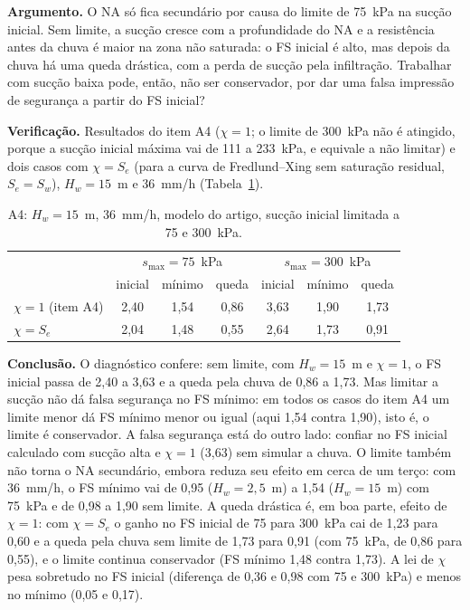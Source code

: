 \textbf{Argumento.} O NA s\'o fica secund\'ario por causa do limite de 75~kPa na suc\c{c}\~ao inicial. Sem limite, a
suc\c{c}\~ao cresce com a profundidade do NA e a resist\^encia antes da chuva \'e maior na zona n\~ao saturada: o FS
inicial \'e alto, mas depois da chuva h\'a uma queda dr\'astica, com a perda de suc\c{c}\~ao pela infiltra\c{c}\~ao.
Trabalhar com suc\c{c}\~ao baixa pode, ent\~ao, n\~ao ser conservador, por dar uma falsa impress\~ao de seguran\c{c}a a
partir do FS inicial?

\textbf{Verifica\c{c}\~ao.} Resultados do item A4 ($\chi=1$; o limite de 300~kPa n\~ao \'e atingido, porque a
suc\c{c}\~ao inicial m\'axima vai de 111 a 233~kPa, e equivale a n\~ao limitar) e dois casos com $\chi=S_e$ (para a
curva de Fredlund--Xing sem satura\c{c}\~ao residual, $S_e=S_w$), $H_w=15$~m e 36~mm/h (Tabela~\ref{tab:disc_A4}).

\begin{table}[h!]
\centering\small
\caption{A4: $H_w=15$~m, 36~mm/h, modelo do artigo, suc\c{c}\~ao inicial limitada a 75 e 300~kPa.}\label{tab:disc_A4}
\begin{tabular}{lcccccc}
\toprule
& \multicolumn{3}{c}{$s_{\max}=75$~kPa} & \multicolumn{3}{c}{$s_{\max}=300$~kPa}\\
& inicial & m\'inimo & queda & inicial & m\'inimo & queda\\
\midrule
$\chi=1$ (item A4) & 2,40 & 1,54 & 0,86 & 3,63 & 1,90 & 1,73\\
$\chi=S_e$ & 2,04 & 1,48 & 0,55 & 2,64 & 1,73 & 0,91\\
\bottomrule
\end{tabular}
\end{table}

\textbf{Conclus\~ao.} O diagn\'ostico confere: sem limite, com $H_w=15$~m e $\chi=1$, o FS inicial passa de 2,40 a
3,63 e a queda pela chuva de 0,86 a 1,73. Mas limitar a suc\c{c}\~ao n\~ao d\'a falsa seguran\c{c}a no FS m\'inimo: em
todos os casos do item A4 um limite menor d\'a FS m\'inimo menor ou igual (aqui 1,54 contra 1,90), isto \'e, o limite
\'e conservador. A falsa seguran\c{c}a est\'a do outro lado: confiar no FS inicial calculado com suc\c{c}\~ao alta e
$\chi=1$ (3,63) sem simular a chuva. O limite tamb\'em n\~ao torna o NA secund\'ario, embora reduza seu efeito em cerca
de um ter\c{c}o: com 36~mm/h, o FS m\'inimo vai de 0,95 ($H_w=2{,}5$~m) a 1,54 ($H_w=15$~m) com 75~kPa e de 0,98 a 1,90
sem limite. A queda dr\'astica \'e, em boa parte, efeito de $\chi=1$: com $\chi=S_e$ o ganho no FS inicial de 75 para
300~kPa cai de 1,23 para 0,60 e a queda pela chuva sem limite de 1,73 para 0,91 (com 75~kPa, de 0,86 para 0,55), e o
limite continua conservador (FS m\'inimo 1,48 contra 1,73). A lei de $\chi$ pesa sobretudo no FS inicial
(diferen\c{c}a de 0,36 e 0,98 com 75 e 300~kPa) e menos no m\'inimo (0,05 e 0,17).


